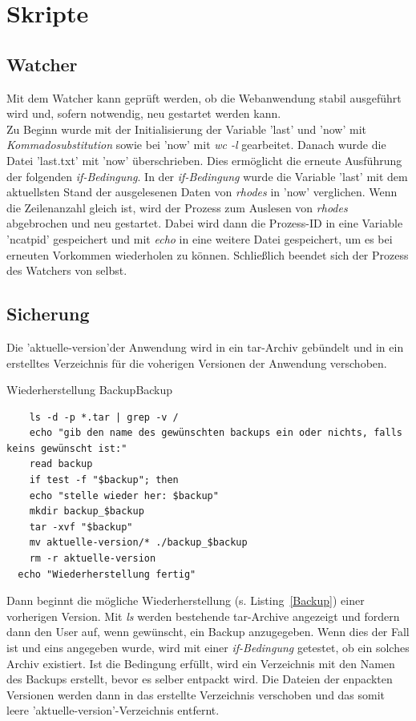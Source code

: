 \section*{Skripte}
\subsection*{Watcher}
Mit dem Watcher kann geprüft werden, ob die Webanwendung stabil ausgeführt wird und, sofern notwendig, neu gestartet werden kann.
\\
Zu Beginn wurde mit der Initialisierung der Variable 'last' und 'now' mit \textit{Kommadosubstitution} sowie bei 'now' mit \textit{wc -l} gearbeitet. Danach wurde die Datei 'last.txt' mit 'now' überschrieben. Dies ermöglicht die erneute Ausführung der folgenden \textit{if-Bedingung}. In der \textit{if-Bedingung} wurde die Variable 'last' mit dem aktuellsten Stand der ausgelesenen Daten von \textit{rhodes} in 'now' verglichen. Wenn die Zeilenanzahl gleich ist, wird der Prozess zum Auslesen von \textit{rhodes} abgebrochen und neu gestartet. Dabei wird dann die Prozess-ID in eine Variable 'ncatpid' gespeichert und mit \textit{echo} in eine weitere Datei gespeichert, um es bei erneuten Vorkommen wiederholen zu können. Schließlich beendet sich der Prozess des Watchers von selbst.

\subsection*{Sicherung}
Die 'aktuelle-version'der Anwendung wird in ein tar-Archiv gebündelt und in ein erstelltes Verzeichnis für die voherigen Versionen der Anwendung verschoben. 

\vspace{-20pt}
\begin{code}{Wiederherstellung Backup}{Backup}
  \begin{verbatim}
    ls -d -p *.tar | grep -v /
    echo "gib den name des gewünschten backups ein oder nichts, falls keins gewünscht ist:"
    read backup
    if test -f "$backup"; then
    echo "stelle wieder her: $backup"
    mkdir backup_$backup
    tar -xvf "$backup"
    mv aktuelle-version/* ./backup_$backup
    rm -r aktuelle-version
  echo "Wiederherstellung fertig"
  \end{verbatim}
\end{code}


Dann beginnt die mögliche Wiederherstellung (s. Listing~\ref{Backup}) einer vorherigen Version.
Mit \textit{ls} werden bestehende tar-Archive angezeigt und fordern dann den User auf, wenn gewünscht, ein Backup anzugegeben. Wenn dies der Fall ist und eins angegeben wurde, wird mit einer \textit{if-Bedingung} getestet, ob ein solches Archiv existiert. Ist die Bedingung erfüllt, wird ein Verzeichnis mit den Namen des Backups erstellt, bevor es selber entpackt wird. Die Dateien der enpackten Versionen werden dann in das erstellte Verzeichnis verschoben und das somit leere 'aktuelle-version'-Verzeichnis entfernt.
